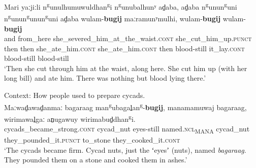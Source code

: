 \begin{exe}
	\ex\label{appendixWubuyRestrictive1} 
	\gll Mari yaːjiːli n\textsuperscript{g}unulhumuwuldhan\textsuperscript{g}i n\textsuperscript{g}unubalhunʸ ad̠aba, ad̠aba n\textsuperscript{g}unun\textsuperscript{g}uni n\textsuperscript{g}unun\textsuperscript{g}unun\textsuperscript{g}uni ad̠aba wulam-\textbf{bugij} maːramunʸmulhi, wulam-\textbf{bugij} wulam-\textbf{bugij}\\
	and from\_here she\_severed\_him\_at\_the\_waist.\textsc{cont} she\_cut\_him\_up.\textsc{punct} then then she\_ate\_him.\textsc{cont} she\_ate\_him.\textsc{cont} then blood-still it\_lay.\textsc{cont} blood-still blood-still\\
	\glt \lq Then she cut through him at the waist, along here. She cut him up (with her long bill) and ate him. There was nothing but blood lying there.' \parencite[70]{Heath1980}
	
	\ex\label{appendixWubuyRestrictive2} 
	Context: How people used to prepare cycads.\\
	\gll Maːwad̠awad̠anmaː bagaraag man\textsuperscript{g}ubagal̠an\textsuperscript{g}-\textbf{bugij}, manamamuwaj bagaraag, wirimawal̠gaː an̠ugawuy wirimabud̠dhan\textsuperscript{g}i.\\
	cycads\_became\_strong.\textsc{cont} cycad\_nut eyes-still named.\textsc{ncl}\textsubscript{MANA} cycad\_nut they\_pounded\_it.\textsc{punct} to\_stone they\_cooked\_it.\textsc{cont}\\ 
\glt \lq The cycads became firm. Cycad nuts, just the ʻeyesʼ (nuts), named \textit{bagaraag}. They pounded them on a stone and cooked them in ashes.' \parencite[416]{Heath1980}
	

\end{exe}
